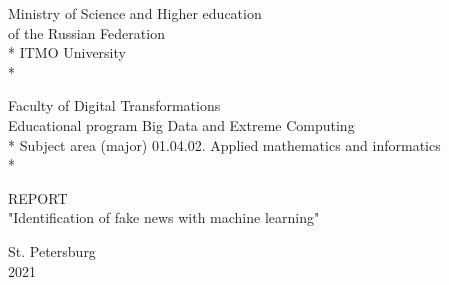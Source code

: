 \newpage
\begin{titlepage}

\begin{center}\large{
    Ministry of Science and Higher education \\
    of the Russian Federation \\*
    ITMO University \\*
}\end{center}

\vspace{6em}

\begin{center}\large{
    Faculty of Digital Transformations \\
    Educational program Big Data and Extreme Computing \\*
    Subject area (major) 01.04.02. Applied mathematics and informatics \\*
}\end{center}

\vspace{6em}

\begin{center}\large{
    REPORT \\
    "Identification of fake news with machine learning"
}\end{center}

\vspace{8.5em}

\vspace{0.5em}

\vspace{1.5em}


\vspace{\fill}

\begin{center}
    St. Petersburg \\
    2021
\end{center}

\end{titlepage}
